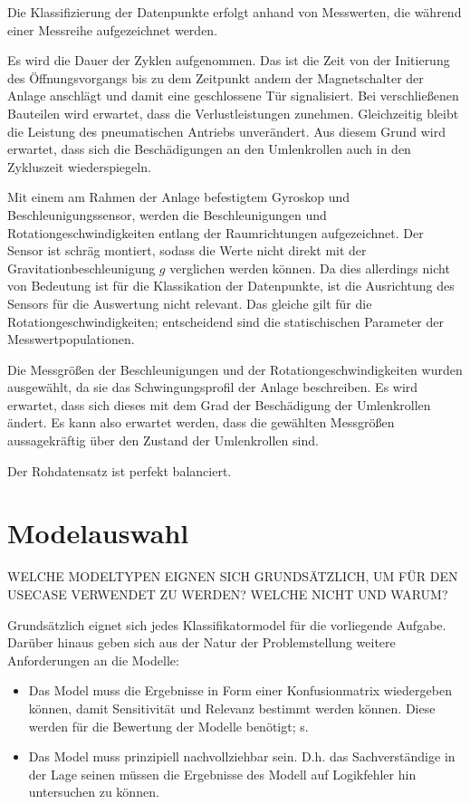 Die Klassifizierung der Datenpunkte erfolgt anhand von Messwerten, die während einer Messreihe aufgezeichnet werden. 

Es wird die Dauer der Zyklen aufgenommen. Das ist die Zeit von der Initierung des Öffnungsvorgangs bis zu dem Zeitpunkt andem der Magnetschalter der Anlage anschlägt und damit eine geschlossene Tür signalisiert. Bei verschließenen Bauteilen wird erwartet, dass die Verlustleistungen zunehmen. Gleichzeitig bleibt die Leistung des pneumatischen Antriebs unverändert. Aus diesem Grund wird erwartet, dass sich die Beschädigungen an den Umlenkrollen auch in den Zykluszeit wiederspiegeln.

Mit einem am Rahmen der Anlage befestigtem Gyroskop und Beschleunigungssensor, werden die Beschleunigungen und Rotationgeschwindigkeiten entlang der Raumrichtungen aufgezeichnet. Der Sensor ist schräg montiert, sodass die Werte nicht direkt mit der Gravitationbeschleunigung $g$ verglichen werden können. Da dies allerdings nicht von Bedeutung ist für die Klassikation der Datenpunkte, ist die Ausrichtung des Sensors für die Auswertung nicht relevant. 
Das gleiche gilt für die Rotationgeschwindigkeiten; entscheidend sind die statischischen Parameter der Messwertpopulationen.

Die Messgrößen der Beschleunigungen und der Rotationgeschwindigkeiten wurden ausgewählt, da sie das Schwingungsprofil der Anlage beschreiben. Es wird erwartet, dass sich dieses mit dem Grad der Beschädigung der Umlenkrollen ändert. Es kann also erwartet werden, dass die gewählten Messgrößen aussagekräftig über den Zustand der Umlenkrollen sind.

Der Rohdatensatz ist perfekt balanciert. 

\section{Modelauswahl}
\label{sec:modelauswahl}
WELCHE MODELTYPEN EIGNEN SICH GRUNDSÄTZLICH, UM FÜR DEN USECASE VERWENDET ZU WERDEN? WELCHE NICHT UND WARUM? 

Grundsätzlich eignet sich jedes Klassifikatormodel für die vorliegende Aufgabe. Darüber hinaus geben sich aus der Natur der Problemstellung weitere Anforderungen an die Modelle:

\begin{itemize}
    \item Das Model muss die Ergebnisse in Form einer Konfusionmatrix wiedergeben können, damit Sensitivität und Relevanz bestimmt werden können.  Diese werden für die Bewertung der Modelle benötigt; s. 
    \item Das Model muss prinzipiell nachvollziehbar sein. D.h. das Sachverständige in der Lage seinen müssen die Ergebnisse des Modell auf Logikfehler hin untersuchen zu können. 
\end{itemize}

